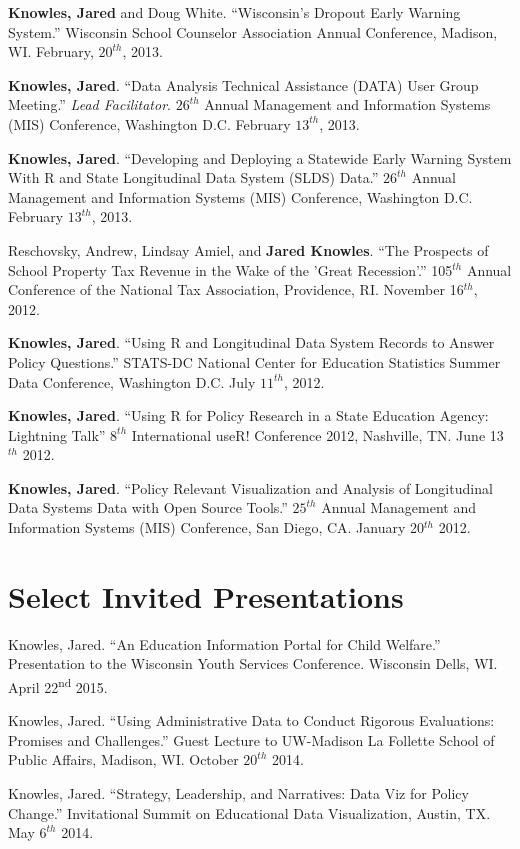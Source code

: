 \documentclass[margin,line]{res}
\begin{document}
\begin{resume}
\textbf{Knowles, Jared} and Doug White. ``Wisconsin's Dropout Early Warning System.'' Wisconsin School Counselor Association Annual Conference, Madison, WI. February, $20^{th}$, 2013. 

\textbf{Knowles, Jared}. ``Data Analysis Technical Assistance (DATA) User Group Meeting.'' \emph{Lead Facilitator}. $26^{th}$ Annual Management and Information Systems (MIS) Conference, Washington D.C. February $13^{th}$, 2013.

\textbf{Knowles, Jared}. ``Developing and Deploying a Statewide Early Warning System With R and State Longitudinal Data System (SLDS) Data.'' $26^{th}$ Annual Management and Information Systems (MIS) Conference, Washington D.C. February $13^{th}$, 2013.

Reschovsky, Andrew, Lindsay Amiel, and \textbf{Jared Knowles}. ``The Prospects of School Property Tax Revenue in the Wake of the 'Great Recession'.'' 105$^{th}$ Annual Conference of the National Tax Association, Providence, RI. November 16$^{th}$, 2012. 

\textbf{Knowles, Jared}. ``Using R and Longitudinal Data System Records to Answer Policy Questions.'' STATS-DC National Center for Education Statistics Summer Data Conference, Washington D.C. July $11^{th}$, 2012.

\textbf{Knowles, Jared}. ``Using R for Policy Research in a State Education Agency: Lightning Talk'' $8^{th}$ International useR! Conference 2012, Nashville, TN. June 13$^{th}$ 2012.

\textbf{Knowles, Jared}. ``Policy Relevant Visualization and Analysis of Longitudinal Data Systems Data with Open Source Tools.'' $25^{th}$ Annual Management and Information Systems (MIS) Conference, San Diego, CA. January 20$^{th}$ 2012.

\section{\sc Select Invited Presentations}

Knowles, Jared. ``An Education Information Portal for Child Welfare.'' Presentation to the Wisconsin Youth Services Conference. Wisconsin Dells, WI. April 22\textsuperscript{nd} 2015.

Knowles, Jared. ``Using Administrative Data to Conduct Rigorous Evaluations: Promises and Challenges.'' Guest Lecture to UW-Madison La Follette School of Public Affairs, Madison, WI. October $20^{th}$ 2014.

Knowles, Jared. ``Strategy, Leadership, and Narratives: Data Viz for Policy Change.'' Invitational Summit on Educational Data Visualization, Austin, TX. May $6^{th}$ 2014. 


\end{resume}
\end{document}
